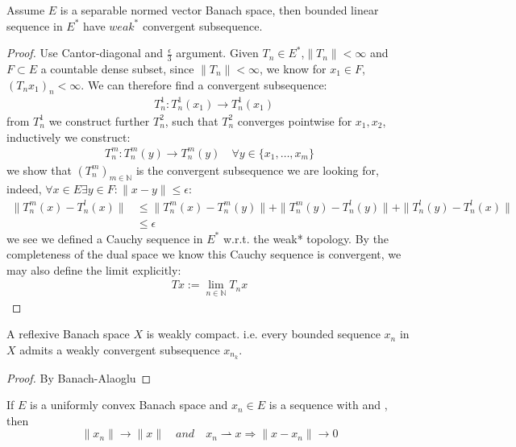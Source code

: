 \begin{theorem}
	Assume $E$ is a separable normed vector Banach space, then bounded linear sequence in $E^*$ have $weak^*$ convergent subsequence.
\end{theorem}
\begin{proof}
	Use Cantor-diagonal and $\frac{\epsilon}{3}$ argument. Given $T_n \in E^*$,$\|T_n\| < \infty$ and $F \subset E$ a countable dense subset, since $\|T_n\| < \infty$, we know for $x_1 \in F$,  $(T_n x_1)_n < \infty $. We can therefore find a convergent subsequence:
	\begin{align*}
		&T_n^1: T_n^1(x_1) \rightarrow T_n^1(x_1)
	\end{align*} 
	from $T_n^1$ we construct further $T_n^2$, such that $T_n^2$ converges pointwise for $x_1, x_2$, inductively we construct:
	\begin{align*}
		T_n^m: T_n^m(y) \rightarrow T_n^m(y) \quad \forall y \in \{x_1, \dots, x_m\}
	\end{align*}
	we show that $(T_n^m)_{m\in \mathbb{N}}$ is the convergent subsequence we are looking for, indeed, $\forall x \in E \exists y \in F: \|x - y\|\le \epsilon$:
	\begin{align*}
		\|T_n^m(x) - T_n^l(x)\| &\le \|T_n^m(x) - T_n^m(y)\| + \|T_n^m(y) - T_n^l(y)\| + \|T_n^l(y) - T_n^l(x)\|\\
		&\le \epsilon
	\end{align*}
	we see we defined a Cauchy sequence in $E^*$ w.r.t. the weak* topology. By the completeness of the dual space we know this Cauchy sequence is convergent, we may also define the limit explicitly:
	\begin{align*}
		Tx := \lim_{n \in \mathbb{N}} T_n x
	\end{align*}
\end{proof}

\begin{corollary}
	A reflexive Banach space $X$ is weakly compact. i.e. every bounded sequence $x_n$ in $X$ admits a weakly convergent subsequence $x_{n_k}$.
\end{corollary}
\begin{proof}
	By Banach-Alaoglu 
\end{proof}

\begin{theorem}
	If $E$ is a uniformly convex Banach space and $x_n \in E$ is a sequence with  and , then 
	\begin{equation*}
		\|x_n\| \rightarrow \|x\| \quad and \quad x_n \rightharpoonup x \Rightarrow \|x - x_n\| \rightarrow 0
	\end{equation*}
\end{theorem}



